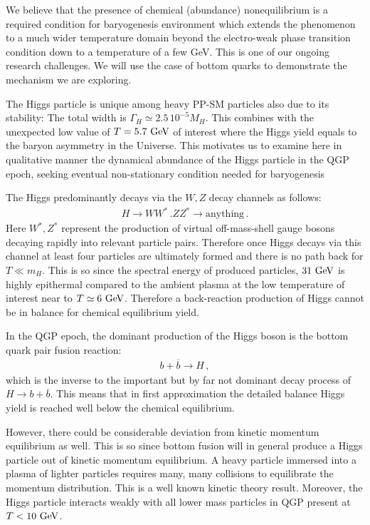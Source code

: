 We believe that the presence of chemical (abundance) nonequilibrium is a required condition for baryogenesis environment which extends the phenomenon to a much wider temperature domain beyond the electro-weak phase transition condition down to a temperature of a few GeV. This is one of our ongoing research challenges. We will use the case of bottom quarks to demonstrate the mechanism we are exploring.
 
The Higgs particle is unique among heavy PP-SM particles also due to its stability: The total width is $\Gamma_H\simeq 2.5\,10^{-5}M_H$. This combines with the unexpected low value of $T=5.7\text{ GeV}$ of interest where the Higgs yield equals to the baryon asymmetry in the Universe. This motivates us to examine here in qualitative manner the dynamical abundance of the Higgs particle in the QGP epoch, seeking eventual non-stationary condition needed for baryogenesis 

The Higgs predominantly decays via the $W,Z$ decay channels as follows:
\begin{align}
H\longrightarrow WW^\ast\,. ZZ^\ast\longrightarrow\mathrm{anything}\,.
\end{align}
Here $W^\ast,Z^\ast$ represent the production of virtual off-mass-shell gauge bosons decaying rapidly into relevant particle pairs. Therefore once Higgs decays via this channel at least four particles are ultimately formed and there is no path back for $T\ll m_H$. This is so since the spectral energy of produced particles, $31\text{ GeV}$ is highly epithermal compared to the ambient plasma at the low temperature of interest near to $T\simeq 6\text{ GeV}$. Therefore a back-reaction production of Higgs cannot be in balance for chemical equilibrium yield. 

In the QGP epoch, the dominant production of the Higgs boson is the bottom quark pair fusion reaction: 
\begin{align}
b+\overline{b}\longrightarrow H\,,
\end{align}
which is the inverse to the important but by far not dominant decay process of $H\to b+\overline{b}$. This means that in first approximation the detailed balance Higgs yield is reached well below the chemical equilibrium.

However, there could be considerable deviation from kinetic momentum equilibrium as well. This is so since bottom fusion will in general produce a Higgs particle out of kinetic momentum equilibrium. A heavy particle immersed into a plasma of lighter particles requires many, many collisions to equilibrate the momentum distribution. This is a well known kinetic theory result. Moreover, the Higgs particle interacts weakly with all lower mass particles in QGP present at $T<10\text{ GeV}$. 

